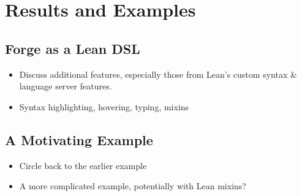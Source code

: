 \section{Results and Examples}

\subsection{Forge as a Lean DSL}
\begin{itemize}
    \item Discuss additional features, especially those from Lean's custom syntax \& language server features. 
    \item Syntax highlighting, hovering, typing, mixins
\end{itemize}

\subsection{A Motivating Example}
\begin{itemize}
    \item Circle back to the earlier example
    \item A more complicated example, potentially with Lean mixins?
\end{itemize}
